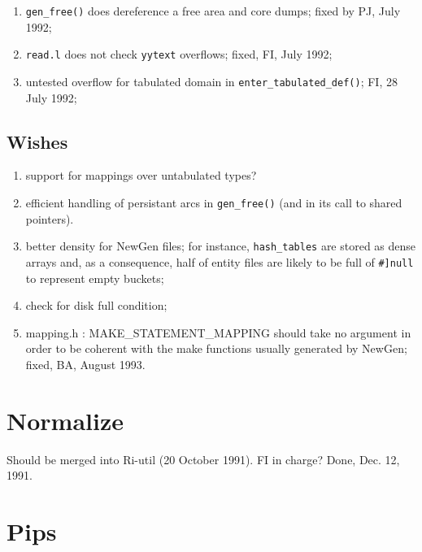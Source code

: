 \begin{enumerate}
  \item \verb+gen_free()+ does dereference a free area and core dumps;
        fixed by PJ, July 1992;

  \item \verb+read.l+ does not check \verb+yytext+ overflows; fixed, FI,
        July 1992;

  \item untested overflow for tabulated domain in \verb+enter_tabulated_def()+;
        FI, 28 July 1992;

\end{enumerate}

\subsection{Wishes}

\begin{enumerate}

  \item support for mappings over untabulated types?

  \item efficient handling of persistant arcs in \verb+gen_free()+
        (and in its call to shared pointers).

  \item better density for NewGen files; for instance, \verb+hash_tables+ are
        stored as dense arrays and, as a consequence, half of entity files
        are likely to be full of \verb+#]null+ to represent empty buckets;

  \item check for disk full condition; 

  \item mapping.h : MAKE\_STATEMENT\_MAPPING should take no argument in
        order to be coherent with the make functions usually generated
        by NewGen; fixed, BA, August 1993. 

\end{enumerate}

\section{Normalize}

Should be merged into Ri-util (20 October 1991). FI in charge? Done,
Dec. 12, 1991.

\newpage

\section{Pips}

